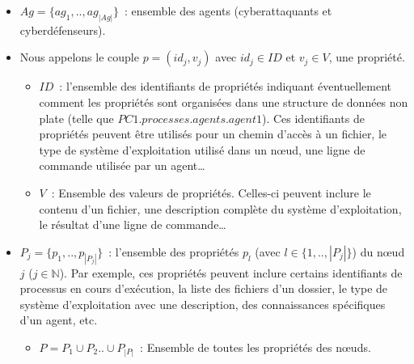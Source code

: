 \begin{itemize}

  \item $Ag = \{ag_1,..,ag_{|Ag|}\}$~: ensemble des agents (cyberattaquants et cyberdéfenseurs).

  \item Nous appelons le couple $p = (id_{j}, v_{j})$ avec $id_j \in {ID}$ et $v_j \in V$, une propriété.
        \begin{itemize}
          \item $ID$~: l'ensemble des identifiants de propriétés indiquant éventuellement comment les propriétés sont organisées dans une structure de données non plate (telle que $PC1. \allowbreak processes.agents.agent1$). Ces identifiants de propriétés peuvent être utilisés pour un chemin d'accès à un fichier, le type de système d'exploitation utilisé dans un nœud, une ligne de commande utilisée par un agent\dots
          \item $V$~: Ensemble des valeurs de propriétés. Celles-ci peuvent inclure le contenu d'un fichier, une description complète du système d'exploitation, le résultat d'une ligne de commande\dots
        \end{itemize}

  \item $P_{j} = \{ p_1, .., p_{|P_{j}|} \}$~: l'ensemble des propriétés $p_{l}$ (avec $l \in \{1,..,|P_{j}|\}$) du nœud $j$ ($j \in \mathbb{N} $). Par exemple, ces propriétés peuvent inclure certains identifiants de processus en cours d'exécution, la liste des fichiers d'un dossier, le type de système d'exploitation avec une description, des connaissances spécifiques d'un agent, etc.
        \begin{itemize}
          \item $P = P_1 \cup P_2 .. \cup P_{|P|} $~: Ensemble de toutes les propriétés des nœuds.
        \end{itemize}


\end{itemize}
